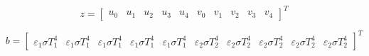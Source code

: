 
\begin{equation}
 z ={ \begin{bmatrix}
 u_0 & 
u_1 &
 u_2 &
 u_3 &
 u_4 &
 v_0 &
 v_1 &
 v_2 &
 v_3 &
 v_4 
 \end{bmatrix} }^{ T } 
 \label{eq:x}
\end{equation}

\begin{equation}
 b ={ \begin{bmatrix}
 \varepsilon_1 \sigma T_1^4 &
 \varepsilon_1 \sigma T_1^4&
 \varepsilon_1 \sigma T_1^4&
 \varepsilon_1 \sigma T_1^4&
 \varepsilon_1 \sigma T_1^4&
 \varepsilon_2 \sigma T_2^4&
 \varepsilon_2 \sigma T_2^4&
 \varepsilon_2 \sigma T_2^4&
 \varepsilon_2 \sigma T_2^4&
 \varepsilon_2 \sigma T_2^4
 \end{bmatrix} }^{ T } 
 \label{eq:b}
\end{equation}



